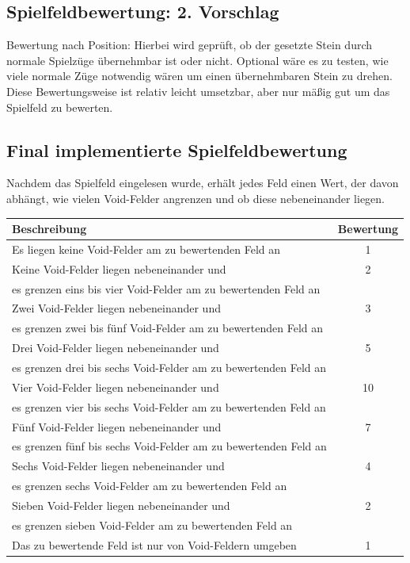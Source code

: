 \documentclass[12pt,a4paper]{article}
\begin{document}
\subsection{Spielfeldbewertung: 2. Vorschlag}
Bewertung nach Position:\newline
Hierbei wird geprüft, ob der gesetzte Stein durch normale Spielzüge übernehmbar ist oder nicht. Optional wäre es zu testen, wie viele normale Züge notwendig wären um einen übernehmbaren Stein zu drehen.\newline 
Diese Bewertungsweise ist relativ leicht umsetzbar, aber nur mäßig gut um das Spielfeld zu bewerten.
\newpage

\subsection{Final implementierte Spielfeldbewertung}
Nachdem das Spielfeld eingelesen wurde, erhält jedes Feld einen Wert, der davon abhängt, wie vielen Void-Felder angrenzen und ob diese nebeneinander liegen.\newline
\begin{tabular}{|l|c|}
	\hline
	Beschreibung & Bewertung\\
	\hline
	Es liegen keine Void-Felder am zu bewertenden Feld an & 1\\
	\hline
	Keine Void-Felder liegen nebeneinander und & 2\\
	es grenzen eins bis vier Void-Felder am zu bewertenden Feld an &\\
	\hline
	Zwei Void-Felder liegen nebeneinander und & 3\\
	es grenzen zwei bis fünf Void-Felder am zu bewertenden Feld an &\\
	\hline
	Drei Void-Felder liegen nebeneinander und & 5\\
	es grenzen drei bis sechs Void-Felder am zu bewertenden Feld an &\\
	\hline
	Vier Void-Felder liegen nebeneinander und & 10\\
	es grenzen vier bis sechs Void-Felder am zu bewertenden Feld an &\\
	\hline
	Fünf Void-Felder liegen nebeneinander und & 7\\
	es grenzen fünf bis sechs Void-Felder am zu bewertenden Feld an &\\
	\hline
	Sechs Void-Felder liegen nebeneinander und & 4\\
	es grenzen sechs Void-Felder am zu bewertenden Feld an &\\
	\hline
	Sieben Void-Felder liegen nebeneinander und & 2\\
	es grenzen sieben Void-Felder am zu bewertenden Feld an &\\
	\hline
	Das zu bewertende Feld ist nur von Void-Feldern umgeben & 1\\
	\hline
\end{tabular}
\end{document}
